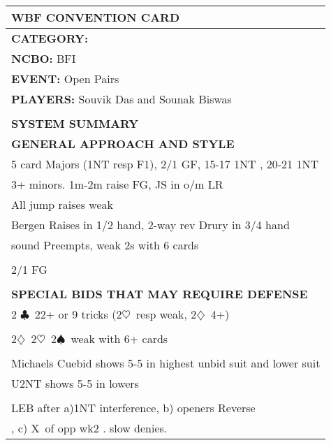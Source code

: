 \documentclass{article}
\newcommand\C{\ensuremath{\clubsuit}}
\newcommand\D{\ensuremath{\diamondsuit}}
\renewcommand\H{\ensuremath{\heartsuit}}
\renewcommand\S{\ensuremath{\spadesuit}}
\newcommand\X{{\footnotesize X}}
\begin{document}
\begin{minipage}{5mm}
	\begin{tabular}{| p{5mm} |}
	\end{tabular}
\end{minipage}
\begin{minipage}{90mm}
	\begin{tabular}{| p{88mm} |}
		\hline
		\cellcolor[gray]{0.9} \textbf{WBF CONVENTION CARD} \\ \hline
		\textbf{CATEGORY:} \\
		\textbf{NCBO:} BFI \\
		\textbf{EVENT:} Open Pairs \\
		\textbf{PLAYERS:} Souvik Das and Sounak Biswas \\
		\multirow{2}{*}{} \\
		\\
		\cellcolor[gray]{0.9} \textbf{SYSTEM SUMMARY} \\ \hline
		\textbf{GENERAL APPROACH AND STYLE} \\ \hline
                5 card Majors (1NT resp F1), 2/1 GF, 15-17 1NT , 20-21 1NT
                \\ \hline
                3+ minors. 1m-2m raise FG, JS in o/m LR
                \\ \hline
                All jump raises weak
		\\ \hline
                Bergen Raises in 1/2 hand, 2-way rev Drury in 3/4 hand
		\\ \hline 
                sound Preempts, weak 2s with 6 cards 
		\\ \hline
		\\ \hline
                2/1 FG
		\\ \hline
		\\ \hline
		\textbf{SPECIAL BIDS THAT MAY REQUIRE DEFENSE} \\ \hline
                2 \C\ 22+ or 9 tricks (2\H\ resp weak, 2\D\ 4+)
		\\ \hline
		\\ \hline
                2\D\, 2\H\, 2\S\ weak with 6+ cards
		\\ \hline
		\\ \hline
                Michaels Cuebid shows 5-5 in highest unbid suit and lower suit
		\\ \hline
                U2NT shows 5-5 in lowers
		\\ \hline
		\\ \hline
                LEB after a)1NT interference, b) openers Reverse
		\\ \hline, c) \X\ of opp wk2 . slow denies.

\end{tabular}
\end{minipage}
\end{document}
